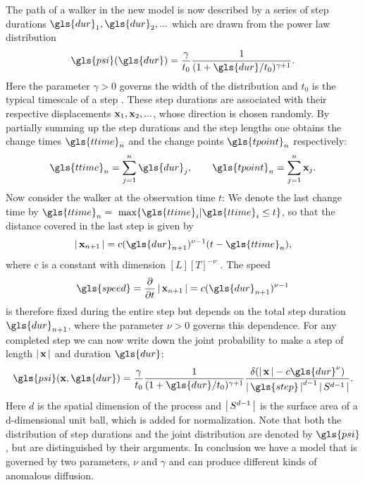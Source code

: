 The path of a walker in the new model is now described by a series of step durations $\gls{dur}_1, \gls{dur}_2, ...$ which are drawn from the power law distribution 
%
\begin{align}
\gls{psi}(\gls{dur}) = \frac{\gamma}{t_0} \frac{1}{(1+\gls{dur}/t_0)^{\gamma+1}} .
\label{eqn:defPsiT}
\end{align}
%
Here the parameter $\gamma>0$ governs the width of the distribution and { \color{blue}$t_0$ is the typical timescale of a step }. These step durations are associated with their respective displacements $\mathbf{ x }_1, \mathbf{ x }_2, ...$, whose direction is chosen randomly. By partially summing up the step durations and the step lengths one obtains the change times $\gls{ttime}_n$ and the change points $\gls{tpoint}_n$ respectively:
%
\begin{align}
\gls{ttime}_n = \sum_{j=1}^n \gls{dur}_j , \qquad \gls{tpoint}_n = \sum_{j=1}^n \ve{x}_j .
\end{align}
%
Now consider the walker at the observation time $t$: We denote the last change time by $\gls{ttime}_n = \text{ max} \{\gls{ttime}_i | \gls{ttime}_i \leq t \}$, so that the distance covered in the last step is given by
%
\begin{align}
\abs{\ve{x}_{n+1}} = c (\gls{dur}_{n+1})^{\nu-1} (t-\gls{ttime}_n) ,
\end{align}
%
where c is a constant with dimension $ [ L ] [ T ]^{-\nu} $ . The speed 
%
\begin{align}
\gls{speed} = \pder{}{t} \abs{\ve{x}_{n+1}} = c (\gls{dur}_{n+1})^{\nu-1}
\end{align}
%
is therefore fixed during the entire step but depends on the total step duration $\gls{dur}_{n+1}$, where the parameter $\nu>0$ governs this dependence. For any completed step we can now write down the joint probability to make a step of length $\left|\,\mathbf{ x }\,\right|$ and duration $\gls{dur}$:
%
\begin{align}
\gls{psi}(\ve{x}, \gls{dur} ) = \frac{\gamma}{t_0} \frac{1}{(1+\gls{dur}/t_0)^{\gamma+1}}  \frac{\delta(\abs{\ve{x}} - c \gls{dur}^{\nu}) }{\abs{\gls{step}}^{d-1} \abs{S^{d-1}}}  \label{eqn:defPsiXT}.
\end{align}
%
Here $d$ is the spatial dimension of the process and $\left|\,S^{d-1}\,\right|$ is the surface area of a d-dimensional unit ball, which is added for normalization. Note that both the distribution of step durations and the joint distribution are denoted by $\gls{psi}$, but are distinguished by their arguments. In conclusion we have a model that is governed by two parameters, $\nu$ and $\gamma$ and can produce different kinds of anomalous diffusion. 

